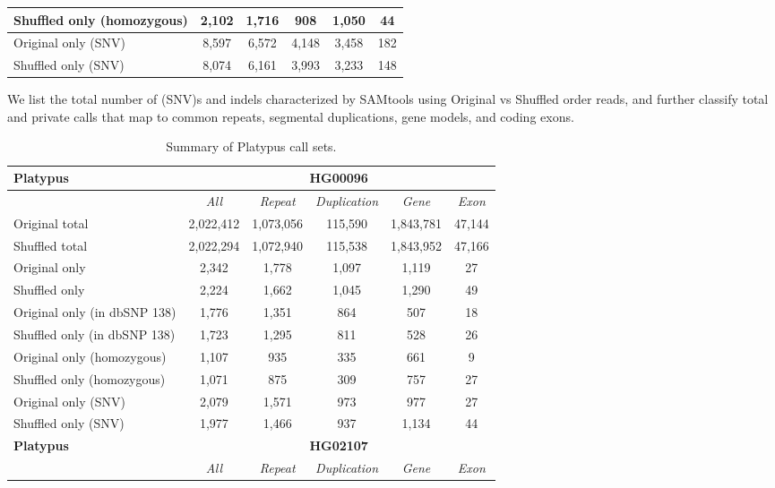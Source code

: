\begin{table}[htb]
\begin{center}
\begin{tabular}{|l|c||c|c|c|c|}
\hline
Shuffled only (homozygous) & 2,102 & 1,716 & 908 & 1,050 & 44 \\
\hline
Original only (SNV) & 8,597 & 6,572 & 4,148 & 3,458 & 182 \\
\hline
Shuffled only (SNV) & 8,074 & 6,161 & 3,993 & 3,233 & 148 \\ 
\hline
\end{tabular}
\end{center}
{\footnotesize We list the total number of (SNV)s and indels characterized by SAMtools using Original vs Shuffled order reads, 
and further classify total and private calls that map to common repeats, segmental duplications, gene models, and coding exons.}
\label{supptab:orig-vs-shuf-samtools}
\end{table}

\begin{table}[htb]
\caption { Summary of Platypus call sets. }
\begin{center}
\begin{tabular}{|l|c||c|c|c|c|}
\hline
{\bf Platypus} & \multicolumn{5}{|c|}{\bf HG00096} \\
\hline
\cline{2-6}
{\bf} & {\it All} & {\it Repeat} & {\it Duplication} & {\it Gene} & {\it Exon} \\
\hline
Original total & 2,022,412 & 1,073,056 & 115,590 & 1,843,781 & 47,144 \\
\hline
Shuffled total & 2,022,294 & 1,072,940 & 115,538 & 1,843,952 & 47,166 \\
\hline
Original only & 2,342 & 1,778 & 1,097 & 1,119 & 27 \\
\hline
Shuffled only & 2,224 & 1,662 & 1,045 & 1,290 & 49 \\
\hline
Original only (in dbSNP 138) & 1,776 & 1,351 & 864 & 507 & 18 \\
\hline
Shuffled only (in dbSNP 138) & 1,723 & 1,295 & 811 & 528 & 26 \\
\hline
Original only (homozygous) & 1,107 & 935 & 335 & 661 & 9 \\
\hline
Shuffled only (homozygous) & 1,071 & 875 & 309 & 757 & 27 \\
\hline
Original only (SNV) & 2,079 & 1,571 & 973 & 977 & 27 \\
\hline
Shuffled only (SNV) & 1,977 & 1,466 & 937 & 1,134 & 44 \\ 
\hline
\hline
{\bf Platypus} & \multicolumn{5}{|c|}{\bf HG02107} \\
\hline
\cline{2-6}
{\bf} & {\it All} & {\it Repeat} & {\it Duplication} & {\it Gene} & {\it Exon} \\

\end{tabular}
\end{center}
\end{table}
